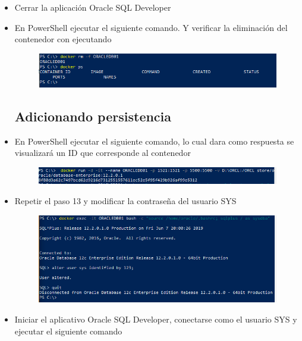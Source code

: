 \begin{itemize}
	\item Cerrar la aplicación Oracle SQL Developer
	\item En PowerShell ejecutar el siguiente comando. Y verificar la eliminación del contenedor con ejecutando
		\begin{figure}[H]
		\begin{center}
		\includegraphics[width=12cm]{./Imagenes/15}
		\end{center}
		\end{figure}


\subsection{ Adicionando persistencia}
	\item En PowerShell ejecutar el siguiente comando, lo cual dara como respuesta se visualizará un ID que corresponde al contenedor
		\begin{figure}[H]
		\begin{center}
		\includegraphics[width=12cm]{./Imagenes/16}
		\end{center}
		\end{figure}
	\item Repetir el paso 13 y modificar la contraseña del usuario SYS
		\begin{figure}[H]
		\begin{center}
		\includegraphics[width=12cm]{./Imagenes/20}
		\end{center}
		\end{figure}
       	\item Iniciar el aplicativo Oracle SQL Developer, conectarse como el usuario SYS y ejecutar el siguiente comando
		\begin{figure}[H]

\end{figure}
\end{itemize}
